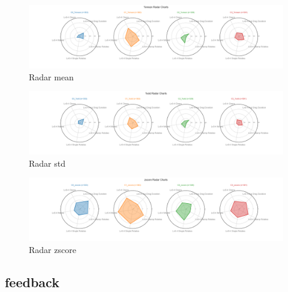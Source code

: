 \documentclass{article}
\begin{document}
\begin{figure}[H]
    \centering
    \includegraphics[width=1\columnwidth]{Crystal/actions_logtransform_zNonepca2k4/radar_mean.png}
    \caption{Radar mean}
    \label{fig:Crystalactionsradarmean}
\end{figure}
\begin{figure}[H]
    \centering
    \includegraphics[width=1\columnwidth]{Crystal/actions_logtransform_zNonepca2k4/radar_std.png}
    \caption{Radar std}
    \label{fig:Crystalactionsradarstd}
\end{figure}
\begin{figure}[H]
    \centering
    \includegraphics[width=1\columnwidth]{Crystal/actions_logtransform_zNonepca2k4/radar_zscore.png}
    \caption{Radar zscore}
    \label{fig:Crystalactionsradarzscore}
\end{figure}
\subsection{feedback}
\end{document}
